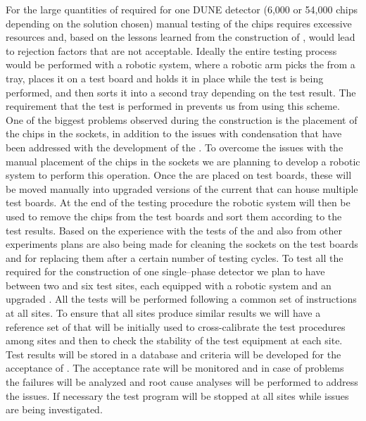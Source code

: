 For the large quantities of
 required for one DUNE  detector
(6,000 or 54,000 chips depending on the  solution
chosen) manual testing of the chips requires excessive 
resources and, based on the lessons learned from the 
construction of , would lead to rejection
factors that are not acceptable. Ideally the entire testing
process would be performed with a robotic system, where 
a robotic arm picks the  from a tray, places
it on a test board and holds it in place while the test
is being performed, and then sorts it into a second tray
depending on the test result. The requirement that the test
is performed in \lntwo prevents us from using this
scheme. One of the biggest problems observed during the
 construction is the placement of the chips in
the sockets, in addition to the issues with condensation
that have been addressed with the development of the .
To overcome the issues with the manual placement of the chips in
the sockets we are planning to develop a robotic system
to perform this operation. Once the  are 
placed on test boards, these will be moved manually into 
upgraded versions of the current  that can
house multiple test boards. At the end of the testing
procedure the robotic system will then be used to remove
the chips from the test boards and sort them according to
the test results. Based on the experience with the tests of
the   and also from other experiments
plans are also being made for cleaning the sockets on the 
test boards and for replacing them after a certain number of
testing cycles. To test all the  required for
the construction of one single--phase detector we plan to
have between two and six test sites, each equipped with a
robotic system and an upgraded . All the tests
will be performed following a common set of instructions
at all sites. To ensure that all sites produce similar
results we will have a reference set of 
that will be initially used to cross-calibrate the 
test procedures among sites and then to check the 
stability of the test equipment at each site. Test results will
be stored in a database and criteria will be developed
for the acceptance of . The acceptance rate 
will be monitored and in case of problems
the failures will be analyzed and root cause analyses
will be performed to address the issues. If necessary
the test program will be stopped at all sites while 
issues are being investigated.

